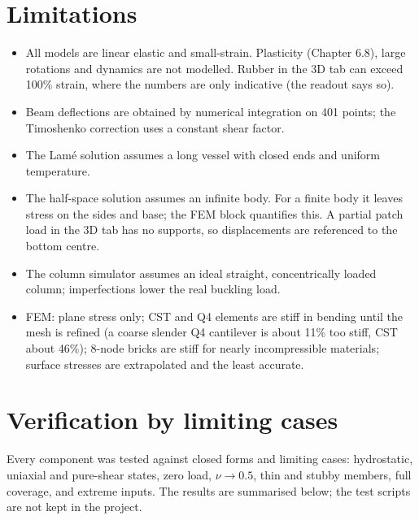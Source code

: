 \documentclass[11pt,a4paper]{article}
\begin{document}
\section{Limitations}
\begin{itemize}
\item All models are linear elastic and small-strain. Plasticity (Chapter 6.8), large rotations and dynamics are not modelled. Rubber in the 3D tab can exceed 100\% strain, where the numbers are only indicative (the readout says so).
\item Beam deflections are obtained by numerical integration on 401 points; the Timoshenko correction uses a constant shear factor.
\item The Lam\'e solution assumes a long vessel with closed ends and uniform temperature.
\item The half-space solution assumes an infinite body. For a finite body it leaves stress on the sides and base; the FEM block quantifies this. A partial patch load in the 3D tab has no supports, so displacements are referenced to the bottom centre.
\item The column simulator assumes an ideal straight, concentrically loaded column; imperfections lower the real buckling load.
\item FEM: plane stress only; CST and Q4 elements are stiff in bending until the mesh is refined (a coarse slender Q4 cantilever is about 11\% too stiff, CST about 46\%); 8-node bricks are stiff for nearly incompressible materials; surface stresses are extrapolated and the least accurate.
\end{itemize}

\section{Verification by limiting cases}
Every component was tested against closed forms and limiting cases: hydrostatic, uniaxial and pure-shear states, zero load, $\nu\to0.5$, thin and stubby members, full coverage, and extreme inputs. The results are summarised below; the test scripts are not kept in the project.
\end{document}
